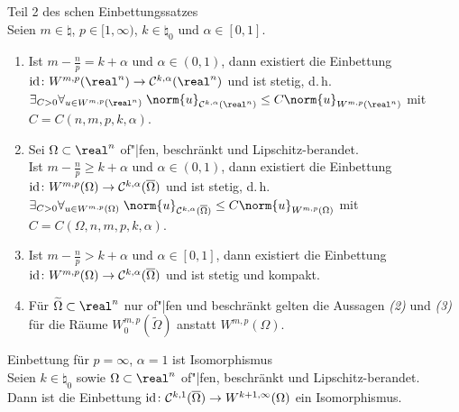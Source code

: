 \begin{Satz}{Teil 2 des schen Einbettungssatzes}\\
    Seien $m \in \natural$, $p \in [1, \infty)$, $k \in \natural_0$ und $\alpha \in [0, 1]$.
    \begin{enumerate}
        \item
        Ist $m - \frac{n}{p} = k + \alpha$ und $\alpha \in (0, 1)$, dann existiert die
        Einbettung
        $\id\colon W^{m,p}(\real^n) \to \C^{k,\alpha}(\real^n)$ und ist stetig, d.\,h.
        $\exists_{C > 0} \forall_{u \in W^{m,p}(\real^n)}\;
        \norm{u}_{\C^{k,\alpha}(\real^n)} \le C \norm{u}_{W^{m,p}(\real^n)}$ mit
        $C = C(n, m, p, k, \alpha)$.
        
        \item
        Sei $\Omega \subset \real^n$ of"|fen, beschränkt und Lipschitz-berandet.\\
        Ist $m - \frac{n}{p} \ge k + \alpha$ und $\alpha \in (0, 1)$, dann existiert die
        Einbettung
        $\text{id}\colon W^{m,p}(\Omega) \to \mathcal{C}^{k,\alpha}(\overline{\Omega})$
        und ist stetig, d.\,h.
        $\exists_{C > 0} \forall_{u \in W^{m,p}(\Omega)}\;
        \norm{u}_{\C^{k,\alpha}(\overline{\Omega})} \le C \norm{u}_{W^{m,p}(\Omega)}$ mit
        $C = C(\Omega, n, m, p, k, \alpha)$.
        
        \item
        Ist $m - \frac{n}{p} > k + \alpha$ und $\alpha \in [0, 1]$, dann existiert die Einbettung
        $\text{id}\colon W^{m,p}(\Omega) \to \mathcal{C}^{k,\alpha}(\overline{\Omega})$ und ist stetig und
        kompakt.
        
        \item
        Für $\widetilde{\Omega} \subset \real^n$ nur of"|fen und beschränkt gelten die Aussagen
        \emph{(2)} und \emph{(3)} für die Räume $W^{m,p}_0(\widetilde{\Omega})$ anstatt
        $W^{m,p}(\Omega)$.
    \end{enumerate}
\end{Satz}

\begin{Satz}{Einbettung für $p = \infty$, $\alpha = 1$ ist Isomorphismus}\\
    Seien $k \in \natural_0$ sowie
    $\Omega \subset \real^n$ of"|fen, beschränkt und Lipschitz-berandet.\\
    Dann ist die Einbettung
    $\text{id}\colon \mathcal{C}^{k,1}(\overline{\Omega}) \to W^{k+1,\infty}(\Omega)$ ein Isomorphismus.
\end{Satz}

\pagebreak
